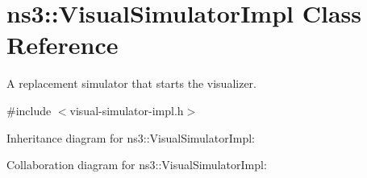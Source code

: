 \hypertarget{classns3_1_1VisualSimulatorImpl}{}\section{ns3\+:\+:Visual\+Simulator\+Impl Class Reference}
\label{classns3_1_1VisualSimulatorImpl}


A replacement simulator that starts the visualizer.  




{\ttfamily \#include $<$visual-\/simulator-\/impl.\+h$>$}



Inheritance diagram for ns3\+:\+:Visual\+Simulator\+Impl\+:


Collaboration diagram for ns3\+:\+:Visual\+Simulator\+Impl\+:
